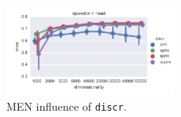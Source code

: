 \begin{figure}[h]
  \centering

  \includegraphics[width=0.5\textwidth]{supplement/figures/men-interaction-discr}

  \caption{MEN influence of \texttt{discr}.}
  \label{fig:men-discr}
\end{figure}
